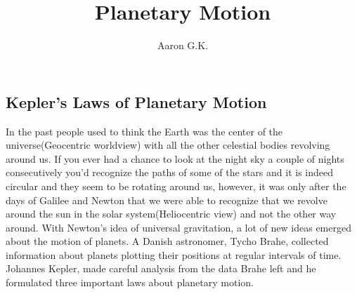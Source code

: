 \documentclass[9pt]{article}
\title{Planetary Motion}
\author{Aaron G.K.}
\begin{document}
	\maketitle
	\begin{center}
		\section*{Kepler's Laws of Planetary Motion}	
	\end{center}
	
	In the past people used to think the Earth was the center of the universe(Geocentric worldview) with all the other celestial bodies revolving around us. If you ever had a chance to look at the night sky a couple of nights consecutively you'd recognize the paths of some of the stars and it is indeed circular and they seem to be rotating around us, however, it was only after the days of Galilee and Newton that we were able to recognize that we revolve around the sun in the solar system(Heliocentric view) and not the other way around. With Newton's idea of universal gravitation, a lot of new ideas emerged about the motion of planets. A Danish astronomer, Tycho Brahe, collected information about planets  plotting their positions at regular intervals of time. Johannes Kepler, made careful analysis from the data Brahe left and he formulated three important laws about planetary motion. \\
	
\end{document}

